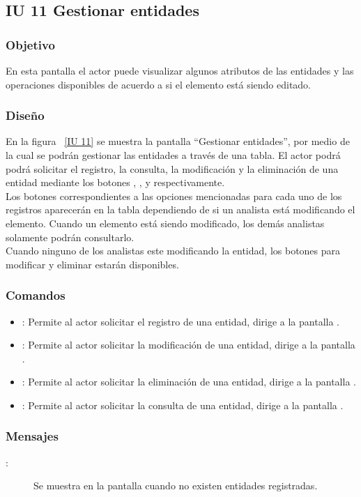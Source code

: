 \subsection{IU 11 Gestionar entidades}
\subsubsection{Objetivo}
	
	En esta pantalla el actor puede visualizar algunos atributos de las entidades y las operaciones disponibles de acuerdo a si el elemento está siendo editado.

\subsubsection{Diseño}

    En la figura ~\ref{IU 11} se muestra la pantalla ``Gestionar entidades'', por medio de la cual 
    se podrán gestionar las entidades a través de una tabla.
    El actor podrá podrá solicitar el registro, la consulta, la modificación y la eliminación de una entidad mediante los botones
    , \btnConsulta, \btnEditar y \btnEliminar respectivamente. \\
    
    Los botones correspondientes a las opciones mencionadas para cada uno de los registros aparecerán en la tabla dependiendo de si 
    un analista está modificando el elemento. Cuando un elemento está siendo modificado, los demás analistas solamente podrán consultarlo.\\
   
    Cuando ninguno de los analistas este modificando la entidad, los botones para modificar y eliminar estarán disponibles.
    


\subsubsection{Comandos}
\begin{itemize}
	\item {}: Permite al actor solicitar el registro de una entidad, dirige a la pantalla .
	\item \btnEditar[Modificar]: Permite al actor solicitar la modificación de una entidad, dirige a la pantalla .
	\item \btnEliminar[Eliminar]: Permite al actor solicitar la eliminación de una entidad, dirige a la pantalla .
	\item \btnConsulta[Consultar]: Permite al actor solicitar la consulta de una entidad, dirige a la pantalla .
\end{itemize}

\subsubsection{Mensajes}

	
\begin{description}
	\item[:] Se muestra en la pantalla  cuando no existen entidades registradas.
\end{description}
